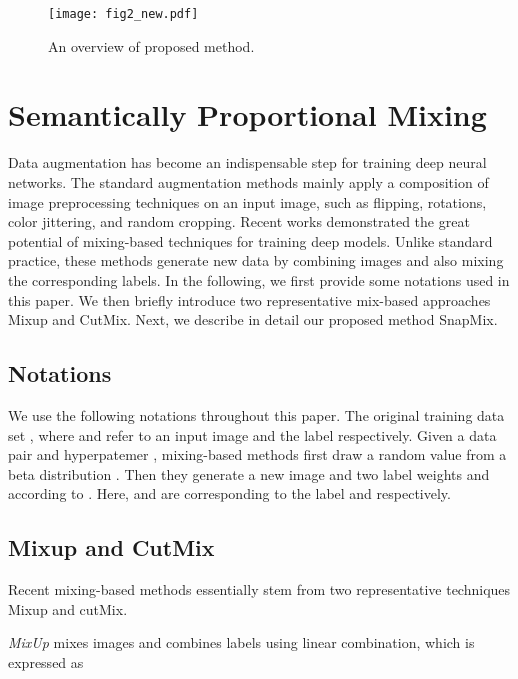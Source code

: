 \documentclass[letterpaper]{article} \usepackage{aaai21}  \usepackage{times}  \usepackage{helvet} \usepackage{courier}  \usepackage[hyphens]{url}  \usepackage{graphicx} \urlstyle{rm} \def\UrlFont{\rm}  \usepackage{natbib}  \usepackage{caption} \frenchspacing  \setlength{\pdfpagewidth}{8.5in}  \setlength{\pdfpageheight}{11in}
\begin{document}
  

\begin{figure*}[t]
  \begin{center}
    \texttt{[image: fig2\_new.pdf]}
  \end{center}
  \caption{An overview of proposed method.}
  \label{fig:overview}
\end{figure*}



\section{Semantically Proportional Mixing}

Data augmentation has become an indispensable step for training deep neural networks. The standard augmentation methods mainly apply a composition of image preprocessing techniques on an input image,  such as flipping, rotations, color jittering, and random cropping.  Recent works demonstrated the great potential of mixing-based techniques for training deep models. Unlike standard practice, these methods generate new data by combining images and also mixing the corresponding labels. In the following, we first provide some notations used in this paper. We then briefly introduce two representative mix-based approaches Mixup and CutMix. Next, we describe in detail our proposed method SnapMix.

\subsection{Notations}
We use the following notations throughout this paper. The original training data set  , where  and  refer to an input image and the label respectively. Given a data pair  and hyperpatemer , mixing-based methods first draw a random value  from a beta distribution . Then they generate a new image  and two label weights  and  according to . Here,  and  are corresponding to the label  and  respectively.  \iffalse

where  denotes element-wise multiplication. Here, different mix-based methods construct  and  in a different way.
\fi
\subsection{Mixup and CutMix}

Recent mixing-based methods essentially stem from two representative techniques Mixup and cutMix. 

\textit{MixUp} mixes images and combines labels using linear combination, which is expressed as
\end{document}
